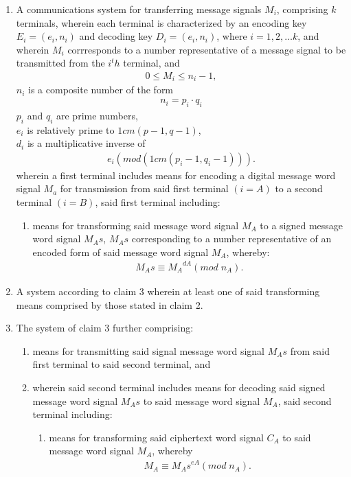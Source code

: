 \documentclass[12pt, a4paper]{article}
\begin{document}
\begin{enumerate}
	\item
	A communications system for transferring message signals $M_i$, comprising $k$ terminals, wherein each terminal is characterized by an encoding key $E_i = (e_i, n_i)$ and decoding key $D_i = (e_i, n_i)$, where $i = 1, 2, \ldots k$, and wherein $M_i$ corrresponds to a number representative of a message signal to be transmitted from the $i^th$ terminal, and 
		\begin{gather*}
			0 \leq M_i \leq n_i-1,
		\end{gather*}	
	$n_i$ is a composite number of the form
		\begin{gather*}
			n_i = p_i \cdot q_i
		\end{gather*}	
	$p_i$ and $q_i$ are prime numbers, \\
	$e_i$ is relatively prime to $1cm(p-1, q-1)$, \\
	$d_i$ is a multiplicative inverse of 
		\begin{gather*}
			e_i(mod(1cm(p_i-1, q_i-1))).
		\end{gather*}	
		wherein a first terminal includes means for encoding a digital message word signal $M_a$ for transmission from said first terminal $(i=A)$ to a second terminal $(i=B)$, said first terminal including:
		\begin{enumerate}
			\item	
			means for transforming said message word signal $M_A$ to a signed message word signal $M_As$, $M_As$ corresponding to a number representative of an encoded form of said message word signal $M_A$, whereby:
			\begin{gather*}
				M_As \equiv {M_A}^{dA} (mod \; n_A).
			\end{gather*}	
		\end{enumerate}
		
	\item
	A system according to claim 3 wherein at least one of said transforming means comprised by those stated in claim 2.
	\item
	The system of claim 3 further comprising:
	\begin{enumerate}
		\item
		means for transmitting said signal message word signal $M_As$ from said first terminal to said second terminal, and
		\item
		wherein said second terminal includes means for decoding said signed message word signal $M_As$ to said message word signal $M_A$, said second terminal including:
			\begin{enumerate}
				\item
				means for transforming said ciphertext word signal $C_A$ to said message word signal $M_A$, whereby			
				\begin{gather*}
				M_A \equiv {M_As}^{eA} (mod \; n_A).
				\end{gather*}	
			\end{enumerate}	
	\end{enumerate}
	

\end{enumerate}
\end{document}
